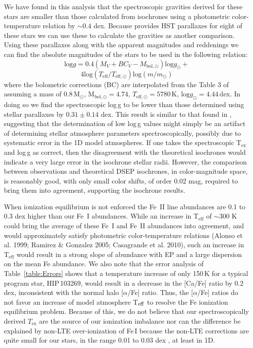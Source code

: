 \documentclass[revtex4]{emulateapj}
\begin{document}
We have found in this analysis that the spectroscopic gravities derived for these stars are smaller than those calculated from isochrones using a photometric color-temperature relation by $\sim0.4$ dex.  Because \citet{Chab2016} provides HST parallaxes for eight of these stars we can use these to calculate the gravities as another comparison.  Using these parallaxes along with the apparent magnitudes and reddenings we can find the absolute magnitudes of the stars to be used in the following relation:
\[\mathrm{log }g = 0.4(M_V+BC_V-M_\mathrm{bol,\odot})\mathrm{log}g_\mathrm{\odot}+\]
\[4\mathrm{log}(T_\mathrm{eff}/T_\mathrm{eff,\odot})\mathrm{log}(m/m_\mathrm{\odot})\]
where the bolometric corrections (BC) are interpolated from the Table 3 of \citet{Flower1996} assuming a mass of 0.8\,M$_\mathrm{\odot}$, M$_\mathrm{bol,\odot}=4.74$, $T_\mathrm{eff,\odot} = 5780$\,K, $\mathrm{log}g_\mathrm{\odot}=4.44$\,dex.  In doing so we find the spectroscopic log\,g to be lower than those determined using stellar parallaxes by $0.31\pm0.14$ dex.  This result is similar to that found in \citet{Roed2014}, suggesting that the determination of low log\,g values might simply be an artifact of determining stellar atmosphere parameters spectroscopically, possibly due to systematic error in the 1D model atmospheres.  If one takes the spectroscopic T$_{\mathrm{ex}}$ and log\,g as correct, then the disagreement with the theoretical isochrones would indicate a very large error in the isochrone stellar radii.  However, the comparison between observations and theoretical DSEP isochrones, in color-magnitude space, is reasonably good, with only small color shifts, of order 0.02 mag, required to bring them into agreement, supporting the isochrone results.

When ionization equilibrium is not enforced the Fe~II line abundances are 0.1 to 0.3 dex higher than our Fe~I abundances.  While an increase in T$_{\mathrm{eff}}$ of $\sim$300 K could bring the average of these Fe~I and Fe~II abundances into agreement, and would approximately satisfy photometric color-temperature relations (Alonso et al. 1999; Ramirez \& Gonzalez 2005; Casagrande et al. 2010), such an increase in T$_{\mathrm{eff}}$ would result in a strong slope of abundance with EP and a large dispersion on the mean Fe abundance.  We also note that the error analysis of Table~\ref{table:Errors} shows that a temperature increase of only 150\,K for a typical program star, HIP\,103269, would result in a decrease in the [Ca/Fe] ratio by 0.2 dex, inconsistent with the normal halo [$\alpha$/Fe] ratio.  Thus, the [$\alpha$/Fe] ratios do not favor an increase of model atmosphere T$_{\rm eff}$ to resolve the Fe ionization equilibrium problem.  Because of this, we do not believe that our spectroscopically derived $T_\mathrm{ex}$ are the source of our ionization imbalance nor can the difference be explained by non-LTE over-ionization of Fe\,I because the non-LTE corrections are quite small for our stars, in the range 0.01 to 0.03 dex \citep[e.g.][]{Lind2012}, at least in 1D.
\end{document}
